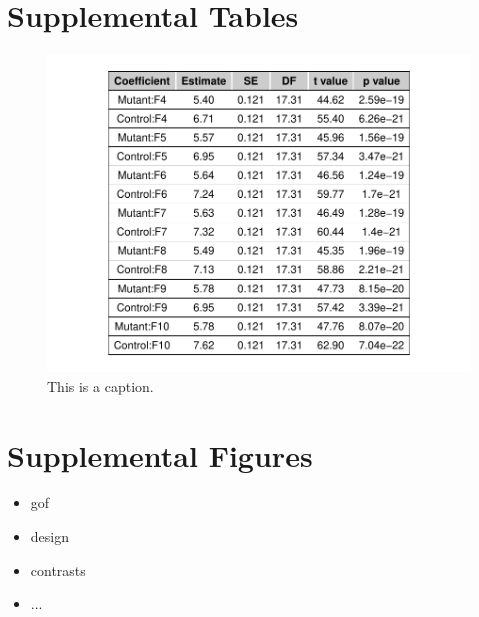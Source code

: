 \documentclass[11pt]{elife}\usepackage[]{graphicx}\usepackage[]{color}
\makeatletter
\def\maxwidth{ %
  \ifdim\Gin@nat@width>\linewidth
    \linewidth
  \else
    \Gin@nat@width
  \fi
}
\newenvironment{knitrout}{}{} %
\makeatother
\begin{document}


\newpage

\section{Supplemental Tables}

\begin{figure}
\begin{knitrout}
\color{fgcolor}

{\centering \includegraphics[width=\maxwidth]{figure/tab0-1} 

}



\end{knitrout}
	\caption{This is a caption.}
	\label{fig:tab0}
\end{figure}

\newpage


\section{Supplemental Figures}

\begin{itemize}
	\item gof
	\item design
	\item contrasts
	\item ...
\end{itemize}

\newpage


\end{document}
